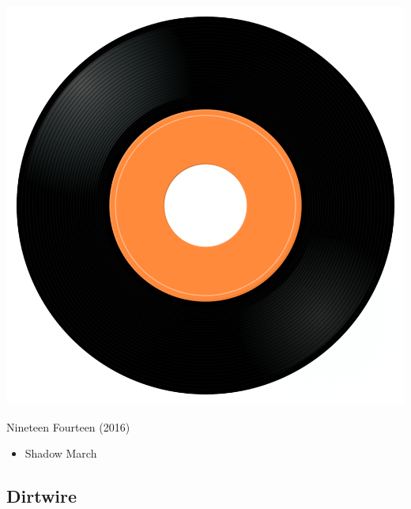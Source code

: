 \begin{minipage}[t]{0.25\textwidth}
\captionsetup{type=figure}
\includegraphics[width=\textwidth]{Images/cover.png}
\caption*{Nineteen Fourteen (2016)}
\end{minipage}
\begin{minipage}[t]{0.25\textwidth}\vspace{0pt}
\begin{itemize}[nosep,leftmargin=1em,labelwidth=*,align=left]
	\setlength{\itemsep}{0pt}
	\item Shadow March
\end{itemize}
\end{minipage}

\subsection{Dirtwire}

